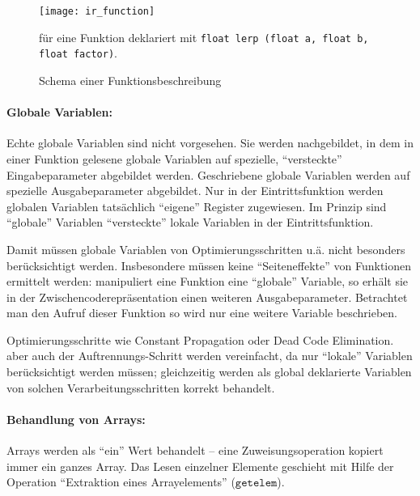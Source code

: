 \documentclass[twoside,a4paper,fleqn,12pt]{book}
\begin{document}
\begin{figure}[h]
   \centering
  \texttt{[image: ir\_function]}
  \caption{Schema einer Funktionsbeschreibung}
  {\small für eine Funktion deklariert mit \texttt{float lerp (float a, float b, float factor)}.}
  \label{fig:ir_function}
\end{figure}

\paragraph{Globale Variablen:}
Echte globale Variablen sind nicht vorgesehen. Sie werden nachgebildet, in dem in einer Funktion gelesene globale Variablen
auf spezielle, "`versteckte"' Eingabeparameter abgebildet werden. Geschriebene globale Variablen werden
auf spezielle Ausgabeparameter abgebildet. Nur in der Eintrittsfunktion werden globalen Variablen tatsächlich
"`eigene"' Register zugewiesen. Im Prinzip sind "`globale"' Variablen "`versteckte"' lokale Variablen in
der Eintrittsfunktion.

Damit müssen globale Variablen von Optimierungsschritten u.ä. nicht besonders berücksichtigt werden.
Insbesondere müssen keine "`Seiteneffekte"' von Funktionen ermittelt werden: manipuliert eine Funktion eine "`globale"' Variable,
so erhält sie in der Zwischencoderepräsentation einen weiteren Ausgabeparameter.
Betrachtet man den Aufruf dieser Funktion so wird nur eine weitere Variable beschrieben.

Optimierungsschritte wie Constant Propagation oder Dead Code Elimination. aber auch der Auftrennungs-Schritt werden vereinfacht,
da nur "`lokale"' Variablen berücksichtigt werden müssen; gleichzeitig werden als global deklarierte Variablen
von solchen Verarbeitungsschritten korrekt behandelt.



\paragraph{Behandlung von Arrays:}
Arrays werden als "`ein"' Wert behandelt -- eine Zuweisungsoperation kopiert immer ein ganzes Array.
Das Lesen einzelner Elemente geschieht mit Hilfe der Operation "`Extraktion eines Arrayelements"' ($\mathtt{getelem}$).
\end{document}
